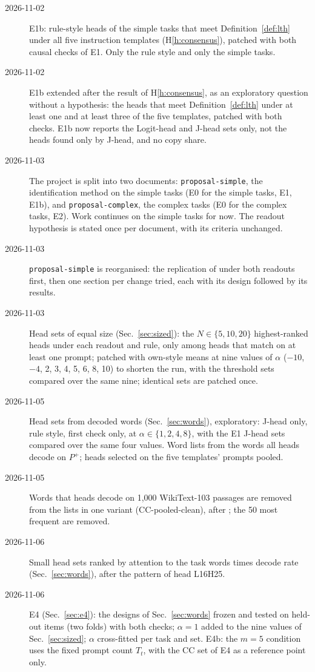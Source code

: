 \documentclass[11pt,a4paper]{article}
\begin{document}
\begin{description}
\item[2026-11-02] E1b: rule-style heads of the simple tasks that meet Definition~\ref{def:lth} under all five instruction templates (H\ref{h:consensus}), patched with both causal checks of E1. Only the rule style and only the simple tasks.
\item[2026-11-02] E1b extended after the result of H\ref{h:consensus}, as an exploratory question without a hypothesis: the heads that meet Definition~\ref{def:lth} under at least one and at least three of the five templates, patched with both checks. E1b now reports the Logit-head and J-head sets only, not the heads found only by J-head, and no copy share.
\item[2026-11-03] The project is split into two documents: \texttt{proposal-simple}, the identification method on the simple tasks (E0 for the simple tasks, E1, E1b), and \texttt{proposal-complex}, the complex tasks (E0 for the complex tasks, E2). Work continues on the simple tasks for now. The readout hypothesis is stated once per document, with its criteria unchanged.
\item[2026-11-03] \texttt{proposal-simple} is reorganised: the replication of \citet{yang2026shared} under both readouts first, then one section per change tried, each with its design followed by its results.
\item[2026-11-03] Head sets of equal size (Sec.~\ref{sec:sized}): the $N\in\{5,10,20\}$ highest-ranked heads under each readout and rule, only among heads that match on at least one prompt; patched with own-style means at nine values of $\alpha$ ($-10$, $-4$, 2, 3, 4, 5, 6, 8, 10) to shorten the run, with the threshold sets compared over the same nine; identical sets are patched once.
\item[2026-11-05] Head sets from decoded words (Sec.~\ref{sec:words}), exploratory: J-head only, rule style, first check only, at $\alpha\in\{1,2,4,8\}$, with the E1 J-head sets compared over the same four values. Word lists from the words all heads decode on $P^{+}$; heads selected on the five templates' prompts pooled.
\item[2026-11-05] Words that heads decode on 1{,}000 WikiText-103 passages are removed from the lists in one variant (CC-pooled-clean), after \citet{davidson2025different}; the 50 most frequent are removed.
\item[2026-11-06] Small head sets ranked by attention to the task words times decode rate (Sec.~\ref{sec:words}), after the pattern of head L16H25.
\item[2026-11-06] E4 (Sec.~\ref{sec:e4}): the designs of Sec.~\ref{sec:words} frozen and tested on held-out items (two folds) with both checks; $\alpha=1$ added to the nine values of Sec.~\ref{sec:sized}; $\alpha$ cross-fitted per task and set. E4b: the $m=5$ condition uses the fixed prompt count $T_t$, with the CC set of E4 as a reference point only.

\end{description}
\end{document}
